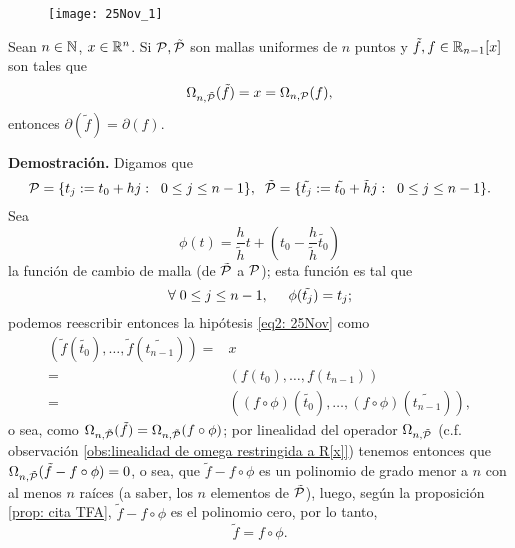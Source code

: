 \begin{figure}[H]
	\centering
	\texttt{[image: 25Nov\_1]} 
\end{figure}	


\begin{prop}
\label{prop: igualdad de grado (menor a n) si dos polinomios al discretizarse dan x}
Sean $n \in \mathbb{N}$, $x \in \mathbb{R}^{n}$.
Si $\mathcal{P}, \tilde{\mathcal{P}}$ son mallas uniformes
de $n$ puntos y $\tilde{f}, f \in \mathbb{R}_{n-1}[x]$
son tales que
\begin{equation}
\label{eq2: 25Nov}
\Omega_{n, \tilde{\mathcal{P}}}(\tilde{f})= x = 
\Omega_{n, \mathcal{P}}(f),
\end{equation}
entonces $\partial(\tilde{f})=\partial(f)$.
\end{prop}
\noindent
\textbf{Demostración.}
Digamos que 
\[
\mathcal{P}=\{t_{j}:=t_{0}+hj: \hspace{0.2cm} 0 \leq j \leq n-1 \},
\hspace{0.2cm}
\mathcal{\tilde{P}}=\{
\tilde{t_{j}}:=\tilde{t_{0}}+ \tilde{h}j: \hspace{0.2cm} 0 \leq j \leq n-1 \}.
\]
Sea 
\[
\phi(t)= \frac{h}{\tilde{h}}t+ \left( t_{0}-  \frac{h}{\tilde{h}}
\tilde{t_{0}}  \right)
\]
la función de cambio de malla
(de $\tilde{\mathcal{P}}$ a $\mathcal{P}$); esta función es 
tal que
\[
\forall \hspace{0.1cm} 0 \leq j \leq n-1, 
\hspace{0.5cm} \phi(\tilde{t_{j}})= 
t_{j};
\]
podemos reescribir entonces la hipótesis \eqref{eq2: 25Nov}
como 
\begin{align*}
(\tilde{f}(\tilde{t_{0}}), \ldots , \tilde{f}(\tilde{t_{n-1}}))
= & x \\
=& (f(t_{0}), \ldots , f(t_{n-1})) \\
=& ((f \circ \phi) (\tilde{t_{0}}), \ldots , 
(f \circ \phi) (\tilde{t_{n-1}})),
\end{align*}
o sea, como $\Omega_{n, \tilde{\mathcal{P}}}(\tilde{f})=
\Omega_{n, \tilde{\mathcal{P}}}(f \circ \phi)$; por linealidad
del operador $\Omega_{n, \tilde{\mathcal{P}}}$
(c.f. observación 
\ref{obs:linealidad de omega restringida a R[x]})
tenemos entonces que
$\Omega_{n, \tilde{\mathcal{P}}}(\tilde{f}-f \circ \phi)=0$,
o sea, que 
$\tilde{f}-f \circ \phi$ es un polinomio de
grado menor a $n$ con al menos $n$ raíces 
(a saber, los $n$ elementos de $\tilde{\mathcal{P}}$), luego, 
según la proposición \ref{prop: cita TFA},
$\tilde{f}-f \circ \phi$
es el polinomio cero, por lo tanto, 
\begin{equation*}
\label{eq3: 25Nov}
\tilde{f}=f \circ \phi.
\end{equation*}

